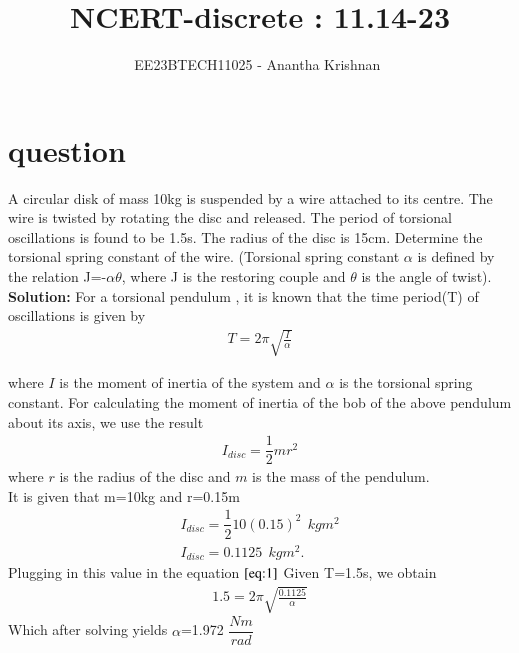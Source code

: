 \documentclass[journal,12pt,twocolumn]{IEEEtran}
\theoremstyle{remark}
\begin{document}

\vspace{3cm}

\title{NCERT-discrete : 11.14-23}
\author{EE23BTECH11025 - Anantha Krishnan $^{}$%
}
\maketitle
\newpage
\bigskip

\renewcommand{\thefigure}{\theenumi}
\renewcommand{\thetable}{\theenumi}

\section{question}
A circular disk of mass 10kg is suspended by a wire attached to its centre. The wire is twisted by rotating the disc and released. The period of torsional oscillations is found to be 1.5s. The radius of the disc is 15cm. Determine the torsional spring constant of the wire. (Torsional spring constant $\alpha$ is defined by the relation J=-$\alpha$$\theta$, where J is the restoring couple and $\theta$ is the angle of twist).\\

\textbf{Solution:}
For a torsional pendulum , it is known that the time period(T) of oscillations is given by
\begin{align}
T=2\pi\sqrt{\frac{I}{\alpha}}   \label{eq:1}
\end{align}

where $I$ is the moment of inertia of the system and $\alpha$ is the torsional spring constant.
For calculating the moment of inertia of the bob of the above pendulum about its axis, we use the result
\begin{align}
            I_{disc}=\dfrac{1}{2}mr^2
\end{align}
 where $r$ is the radius of the disc and $m$ is the mass of the pendulum.\\
It is given that m=10kg and r=0.15m
\begin{align}
I_{disc}=\dfrac{1}{2}10(0.15)^2 \:\:kgm^2\\
I_{disc}=0.1125\:\: kgm^2.
\end{align}
Plugging in this value in the equation $\eqref{eq:1}$ Given T=1.5s, we obtain
\begin{align}
    1.5=2\pi\sqrt{\frac{0.1125}{\alpha}}
    \end{align}
Which after solving yields $\alpha$=1.972 $\dfrac{Nm}{rad}$
\end{document}
